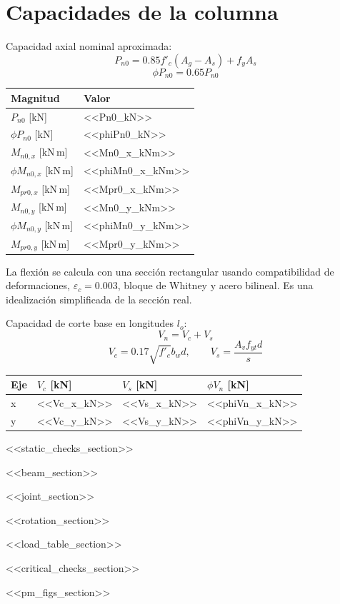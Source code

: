 \documentclass[11pt,a4paper]{article}
\begin{document}
\section*{Capacidades de la columna}
Capacidad axial nominal aproximada:
\[
P_{n0} = 0.85 f'_c(A_g-A_s) + f_y A_s
\]
\[
\phi P_{n0} = 0.65 P_{n0}
\]
\begin{tabular}{ll}
\toprule
Magnitud & Valor \\
\midrule
$P_{n0}$ [kN] & <<Pn0_kN>> \\
$\phi P_{n0}$ [kN] & <<phiPn0_kN>> \\
$M_{n0,x}$ [kN\,m] & <<Mn0_x_kNm>> \\
$\phi M_{n0,x}$ [kN\,m] & <<phiMn0_x_kNm>> \\
$M_{pr0,x}$ [kN\,m] & <<Mpr0_x_kNm>> \\
$M_{n0,y}$ [kN\,m] & <<Mn0_y_kNm>> \\
$\phi M_{n0,y}$ [kN\,m] & <<phiMn0_y_kNm>> \\
$M_{pr0,y}$ [kN\,m] & <<Mpr0_y_kNm>> \\
\bottomrule
\end{tabular}

La flexi\'on se calcula con una secci\'on rectangular usando compatibilidad de deformaciones, $\varepsilon_c=0.003$, bloque de Whitney y acero bilineal. Es una idealizaci\'on simplificada de la secci\'on real.

Capacidad de corte base en longitudes $l_o$:
\[
V_n = V_c + V_s
\]
\[
V_c = 0.17\sqrt{f'_c} b_w d, \qquad V_s = \frac{A_v f_{yt} d}{s}
\]
\begin{tabular}{llll}
\toprule
Eje & $V_c$ [kN] & $V_s$ [kN] & $\phi V_n$ [kN] \\
\midrule
x & <<Vc_x_kN>> & <<Vs_x_kN>> & <<phiVn_x_kN>> \\
y & <<Vc_y_kN>> & <<Vs_y_kN>> & <<phiVn_y_kN>> \\
\bottomrule
\end{tabular}

<<static_checks_section>>

<<beam_section>>

<<joint_section>>

<<rotation_section>>

<<load_table_section>>

<<critical_checks_section>>

<<pm_figs_section>>
\end{document}

